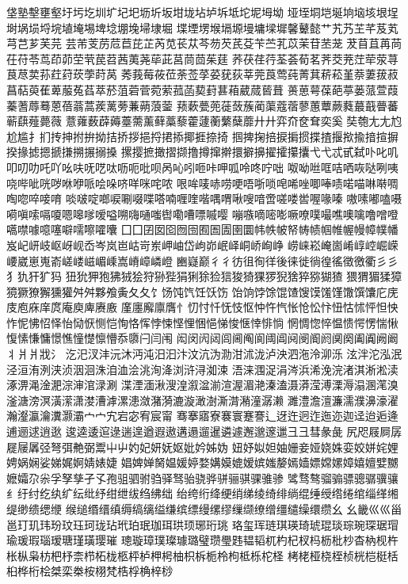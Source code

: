 垡塾墼壅壑圩圬圪圳圹圮圯坜圻坂坩垅坫垆坼坻坨坭坶坳
垭垤垌垲埏垧垴垓垠埕埘埚埙埒垸埴埯埸埤埝堋堍埽埭堀
堞堙塄堠塥塬墁墉墚墀馨鼙懿艹艽艿芏芊芨芄芎芑芗芙芫
芸芾芰苈苊苣芘芷芮苋苌苁芩芴芡芪芟苄苎芤苡茉苷苤茏
茇苜苴苒苘茌苻苓茑茚茆茔茕苠苕茜荑荛荜茈莒茼茴茱莛
荞茯荏荇荃荟荀茗荠茭茺茳荦荥荨茛荩荬荪荭荮莰荸莳莴
莠莪莓莜莅荼莶莩荽莸荻莘莞莨莺莼菁萁菥菘堇萘萋菝菽
菖萜萸萑萆菔菟萏萃菸菹菪菅菀萦菰菡葜葑葚葙葳蒇蒈葺
蒉葸萼葆葩葶蒌蒎萱葭蓁蓍蓐蓦蒽蓓蓊蒿蒺蓠蒡蒹蒴蒗蓥
蓣蔌甍蔸蓰蔹蔟蔺蕖蔻蓿蓼蕙蕈蕨蕤蕞蕺瞢蕃蕲蕻薤薨薇
薏蕹薮薜薅薹薷薰藓藁藜藿蘧蘅蘩蘖蘼⼶廾弈夼奁耷奕奚
奘匏⼪尢尥尬尴扌扪抟抻拊拚拗拮挢拶挹捋捃掭揶捱捺掎
掴捭掬掊捩掮掼揲揸揠揿揄揞揎摒揆掾摅摁搋搛搠搌搦搡
摞撄摭撖摺撷撸撙撺擀擐擗擤擢攉攥攮⼷弋忒甙弑卟叱叽
叩叨叻吒吖吆呋呒呓呔呖呃吡呗呙吣吲咂咔呷呱呤咚咛咄
呶呦咝哐咭哂咴哒咧咦哓哔呲咣哕咻咿哌哙哚哜咩咪咤哝
哏哞唛哧唠哽唔哳唢唣唏唑唧唪啧喏喵啉啭啁啕唿啐唼唷
啖啵啶啷唳唰啜喋嗒喃喱喹喈喁喟啾嗖喑啻嗟喽喾喔喙嗪
嗷嗉嘟嗑嗫嗬嗔嗦嗝嗄嗯嗥嗲嗳嗌嗍嗨嗵嗤辔嘞嘈嘌嘁嘤
嘣嗾嘀嘧嘭噘嘹噗嘬噍噢噙噜噌噔嚆噤噱噫噻噼嚅嚓嚯囔
⼞囗囝囡囵囫囹囿圄圊圉圜帏帙帔帑帱帻帼帷幄幔幛幞幡
岌屺岍岐岖岈岘岙岑岚岜岵岢岽岬岫岱岣峁岷峄峒峤峋峥
崂崃崧崦崮崤崞崆崛嵘崾崴崽嵬嵛嵯嵝嵫嵋嵊嵩嵴嶂嶙嶝
豳嶷巅⼻彳彷徂徇徉後徕徙徜徨徭徵徼衢⼺彡犭犰犴犷犸
狃狁狎狍狒狨狯狩狲狴狷猁狳猃狺狻猗猓猡猊猞猝猕猢猹
猥猬猸猱獐獍獗獠獬獯獾⾇舛夥飧夤⼡夂饣饧饨饩饪饫饬
饴饷饽馀馄馇馊馍馐馑馓馔馕庀庑庋庖庥庠庹庵庾庳赓廒
廑廛廨廪膺忄忉忖忏怃忮怄忡忤忾怅怆忪忭忸怙怵怦怛怏
怍怩怫怊怿怡恸恹恻恺恂恪恽悖悚悭悝悃悒悌悛惬悻悱惝
惘惆惚悴愠愦愕愣惴愀愎愫慊慵憬憔憧憷懔懵忝隳闩闫闱
闳闵闶闼闾阃阄阆阈阊阋阌阍阏阒阕阖阗阙阚丬⽙爿戕氵
汔汜汊沣沅沐沔沌汨汩汴汶沆沩泐泔沭泷泸泱泗沲泠泖泺
泫泮沱泓泯泾洹洧洌浃浈洇洄洙洎洫浍洮洵洚浏浒浔洳涑
浯涞涠浞涓涔浜浠浼浣渚淇淅淞渎涿淠渑淦淝淙渖涫渌涮
渫湮湎湫溲湟溆湓湔渲渥湄滟溱溘滠漭滢溥溧溽溻溷滗溴
滏溏滂溟潢潆潇漤漕滹漯漶潋潴漪漉漩澉澍澌潸潲潼潺濑
濉澧澹澶濂濡濮濞濠濯瀚瀣瀛瀹瀵灏灞⼧宀宄宕宓宥宸甯
骞搴寤寮褰寰蹇謇辶迓迕迥迮迤迩迦迳迨逅逄逋逦逑逍逖
逡逵逶逭逯遄遑遒遐遨遘遢遛暹遴遽邂邈邃邋⼹彐彗彖彘
尻咫屐屙孱屣屦羼弪弩弭艴弼鬻⼬屮妁妃妍妩妪妣妗姊妫
妞妤姒妲妯姗妾娅娆姝娈姣姘姹娌娉娲娴娑娣娓婀婧婊婕
娼婢婵胬媪媛婷婺媾嫫媲嫒嫔媸嫠嫣嫱嫖嫦嫘嫜嬉嬗嬖嬲
嬷孀尕尜孚孥孳孑孓孢驵驷驸驺驿驽骀骁骅骈骊骐骒骓骖
骘骛骜骝骟骠骢骣骥骧纟纡纣纥纨纩纭纰纾绀绁绂绉绋绌
绐绔绗绛绠绡绨绫绮绯绱绲缍绶绺绻绾缁缂缃缇缈缋缌缏
缑缒缗缙缜缛缟缡缢缣缤缥缦缧缪缫缬缭缯缰缱缲缳缵⼳
幺畿⼮巛甾邕玎玑玮玢玟珏珂珑玷玳珀珉珈珥珙顼琊珩珧
珞玺珲琏琪瑛琦琥琨琰琮琬琛琚瑁瑜瑗瑕瑙瑷瑭瑾璜璎璀
璁璇璋璞璨璩璐璧瓒璺韪韫韬杌杓杞杈杩枥枇杪杳枘枧杵
枨枞枭枋杷杼柰栉柘栊柩枰栌柙枵柚枳柝栀柃枸柢栎柁柽
栲栳桠桡桎桢桄桤梃栝桕桦桁桧桀栾桊桉栩梵梏桴桷梓桫
